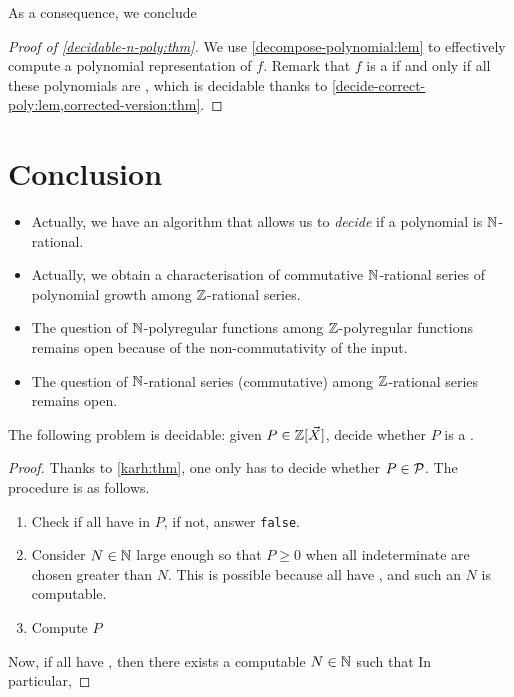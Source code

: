 \documentclass[a4paper,11pt]{article}
\begin{document}
As a consequence, we conclude 
\begin{proof}[Proof of \cref{decidable-n-poly:thm}]
    We use \cref{decompose-polynomial:lem}
    to effectively compute
    a polynomial representation of $f$. Remark that
    $f$ is a  if and only if
    all these polynomials are ,
    which is decidable thanks to
    \cref{decide-correct-poly:lem,corrected-version:thm}.
\end{proof}

\section{Conclusion}
\label{sec:ccl}

\begin{itemize}
    \item Actually, we have an algorithm that allows
        us to \emph{decide} if a polynomial is $\mathbb{N}$-rational.
    \item Actually, we obtain a characterisation of
        commutative 
        $\mathbb{N}$-rational series of polynomial growth
        among $\mathbb{Z}$-rational series.
    \item The question of $\mathbb{N}$-polyregular functions
        among $\mathbb{Z}$-polyregular functions remains open
        because of the non-commutativity of the input.
    \item The question of $\mathbb{N}$-rational series (commutative)
        among $\mathbb{Z}$-rational series remains open.
\end{itemize}


\begin{corollary}
    The following problem is decidable: given $P \in \mathbb{Z}[\vec{X}]$,
    decide whether $P$ is a .
\end{corollary}
\begin{proof}
    Thanks to \cref{karh:thm}, one only has to decide whether
    $P \in \mathcal{P}$. The procedure is as follows.
    \begin{enumerate}
        \item Check if all  have
             in $P$, if not, answer \texttt{false}.
        \item Consider $N \in \mathbb{N}$ large enough so that
              $P \geq 0$ when all indeterminate are chosen greater
              than $N$. This is possible because all  have , and such an $N$
              is computable.
        \item Compute $P$
    \end{enumerate}

    Now, if all 
    have , then there exists a computable
    $N \in \mathbb{N}$ such that 
    In particular, 


\end{proof}
\end{document}

